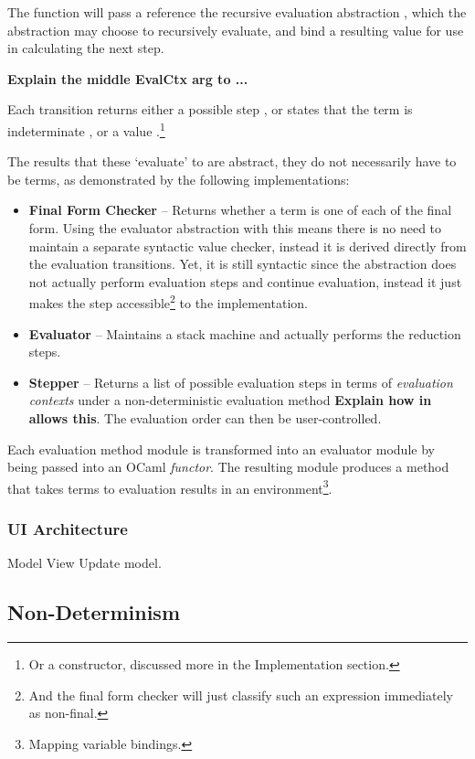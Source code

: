 The  function will pass a reference the recursive evaluation abstraction , which the abstraction may choose to recursively evaluate, and bind a resulting value for use in calculating the next step.

\textbf{Explain the middle EvalCtx arg to ...}

Each transition returns either a possible step , or states that the term is indeterminate , or a value .\footnote{Or a constructor, discussed more in the Implementation section.}

The results that these `evaluate' to are abstract, they do not necessarily have to be terms, as demonstrated by the following implementations:
\begin{itemize}
\item \textbf{Final Form Checker} -- Returns whether a term is one of each of the final form. Using the evaluator abstraction with this means there is no need to maintain a separate syntactic value checker, instead it is derived directly from the evaluation transitions. Yet, it is still syntactic since the abstraction does not actually perform evaluation steps and continue evaluation, instead it just makes the step accessible\footnote{And the final form checker will just classify such an expression immediately as non-final.} to the implementation.
\item \textbf{Evaluator} -- Maintains a stack machine and actually performs the reduction steps.
\item \textbf{Stepper} -- Returns a list of possible evaluation steps in terms of \textit{evaluation contexts} under a non-deterministic evaluation method \textbf{Explain how  in  allows this}. The evaluation order can then be user-controlled. 
\end{itemize}
Each evaluation method module is transformed into an evaluator module by being passed into an OCaml \textit{functor}. The resulting module produces a  method that takes terms to evaluation results in an environment\footnote{Mapping variable bindings.}.

\subsubsection{UI Architecture}\label{sec:HazelUIArchitecture}
Model View Update model.

\subsection{Non-Determinism}\label{sec:Nondeterminism}



